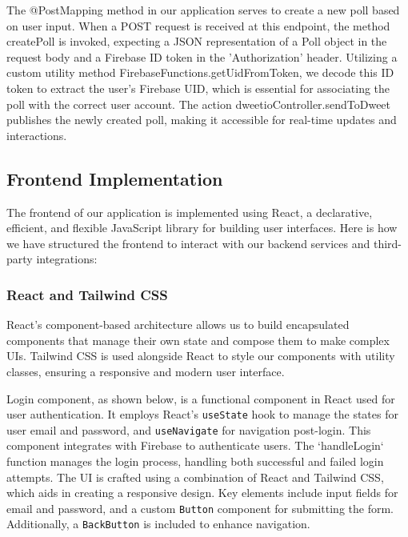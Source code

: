 The @PostMapping method in our application serves to create a new poll based on user input. When a POST request is received at this endpoint, the method createPoll is invoked, expecting a JSON representation of a Poll object in the request body and a Firebase ID token in the 'Authorization' header. Utilizing a custom utility method FirebaseFunctions.getUidFromToken, we decode this ID token to extract the user's Firebase UID, which is essential for associating the poll with the correct user account. The action dweetioController.sendToDweet publishes the newly created poll, making it accessible for real-time updates and interactions.



\subsection{Frontend Implementation}

The frontend of our application is implemented using React, a declarative, efficient, and flexible JavaScript library for building user interfaces. Here is how we have structured the frontend to interact with our backend services and third-party integrations:

\subsubsection*{React and Tailwind CSS}
React’s component-based architecture allows us to build encapsulated components that manage their own state and compose them to make complex UIs. Tailwind CSS is used alongside React to style our components with utility classes, ensuring a responsive and modern user interface.



Login component, as shown below, is a functional component in React used for user authentication. It employs React's \texttt{useState} hook to manage the states for user email and password, and \texttt{useNavigate} for navigation post-login. This component integrates with Firebase to authenticate users. The `handleLogin` function manages the login process, handling both successful and failed login attempts. The UI is crafted using a combination of React and Tailwind CSS, which aids in creating a responsive design. Key elements include input fields for email and password, and a custom \texttt{Button} component for submitting the form. Additionally, a \texttt{BackButton} is included to enhance navigation.

